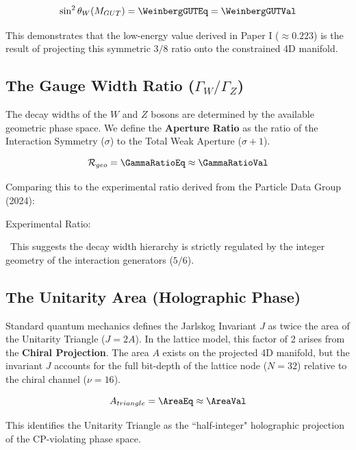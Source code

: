 \begin{equation}
    \sin^2 \theta_W(M_{GUT}) = \WeinbergGUTEq = \WeinbergGUTVal
\end{equation}

This demonstrates that the low-energy value derived in Paper I ($\approx 0.223$) is the result of projecting this symmetric $3/8$ ratio onto the constrained 4D manifold.

\subsection{The Gauge Width Ratio (\texorpdfstring{$\Gamma_W / \Gamma_Z$}{GammaWDivGammaZ})}
The decay widths of the $W$ and $Z$ bosons are determined by the available geometric phase space. We define the \textbf{Aperture Ratio} as the ratio of the Interaction Symmetry ($\sigma$) to the Total Weak Aperture ($\sigma+1$).

\begin{equation}
    \mathcal{R}_{geo} = \GammaRatioEq \approx \GammaRatioVal
\end{equation}

Comparing this to the experimental ratio derived from the Particle Data Group (2024):
\begin{center}
    Experimental Ratio: \GammaRatioExperimentalValue
\end{center}

\GammaRatioAccText \ This suggests the decay width hierarchy is strictly regulated by the integer geometry of the interaction generators ($5/6$).

\subsection{The Unitarity Area (Holographic Phase)}
Standard quantum mechanics defines the Jarlskog Invariant $J$ as twice the area of the Unitarity Triangle ($J = 2A$). In the lattice model, this factor of 2 arises from the \textbf{Chiral Projection}. The area $A$ exists on the projected 4D manifold, but the invariant $J$ accounts for the full bit-depth of the lattice node ($N=32$) relative to the chiral channel ($\nu=16$).

\begin{equation}
    A_{triangle} = \AreaEq \approx \AreaVal
\end{equation}

This identifies the Unitarity Triangle as the ``half-integer" holographic projection of the CP-violating phase space.